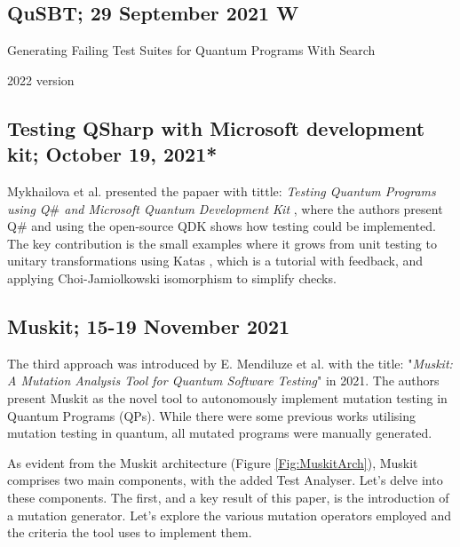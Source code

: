 \begin{itemize}
\vspace{15pt}
\subsection{QuSBT; 29 September 2021 W}

Generating Failing Test Suites for Quantum Programs With Search \cite{wang2021generating}

2022 version \cite{wang2022qusbt}

\vspace{15pt}
\subsection{Testing QSharp with Microsoft development kit; October 19, 2021*}

Mykhailova et al. presented the papaer with tittle: \textit{Testing Quantum Programs using Q$\#$ and Microsoft Quantum
Development Kit} \cite{mykhailova2021testing}, where the authors present Q$\#$ and using the open-source QDK shows how testing could be implemented. The key contribution is the small examples where it grows from unit testing to unitary transformations using Katas \cite{mykhailova2020quantum}, which is a tutorial with feedback, and applying Choi-Jamiolkowski isomorphism \cite{choi1975completely}\cite{jamiolkowski1972linear} to simplify checks.

\vspace{15pt}
\subsection{Muskit; 15-19 November 2021}
\label{Ch3.2.3:Muskit}
The third approach was introduced by E. Mendiluze et al. with the title: "\textit{Muskit: A Mutation Analysis Tool for Quantum Software Testing}"\cite{mendiluze2021muskit} in 2021. The authors present Muskit as the novel tool to autonomously implement mutation testing in Quantum Programs (QPs). While there were some previous works\cite{ali2021assessing}\cite{wang2021quito} utilising mutation testing in quantum, all mutated programs were manually generated.\newline

As evident from the Muskit architecture (Figure \ref{Fig:MuskitArch}), Muskit comprises two main components, with the added Test Analyser. Let's delve into these components. The first, and a key result of this paper, is the introduction of a mutation generator. Let's explore the various mutation operators employed and the criteria the tool uses to implement them.


\end{itemize}
